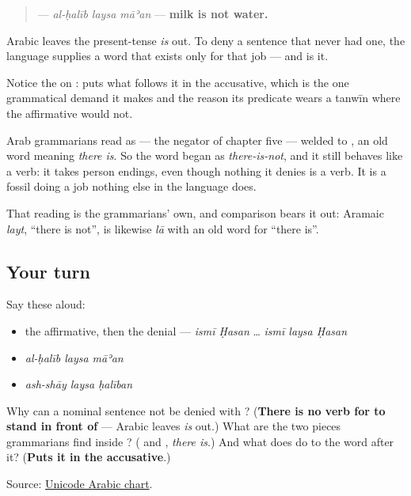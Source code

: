 \begin{quote}
\textbf{  } — \emph{al-ḥalīb laysa māʾan} — \textbf{milk is not water.}
\end{quote}

Arabic leaves the present-tense \emph{is} out. To deny a sentence that never had one, the language supplies a word that exists only for that job — and \textbf{} is it.

Notice the \textbf{} on \textbf{}: \textbf{} puts what follows it in the accusative, which is the one grammatical demand it makes and the reason its predicate wears a tanwīn where the affirmative would not.

\begin{cousinweb}
Arab grammarians read \textbf{} as \textbf{} — the negator of chapter five — welded to \textbf{}, an old word meaning \emph{there is}. So the word began as \emph{there-is-not}, and it still behaves like a verb: it takes person endings, even though nothing it denies is a verb. It is a fossil doing a job nothing else in the language does.

That reading is the grammarians' own, and comparison bears it out: Aramaic \emph{layt}, \textquotedblleft{}there is not\textquotedblright{}, is likewise \emph{lā} with an old word for \textquotedblleft{}there is\textquotedblright{}.
\end{cousinweb}

\subsection*{Your turn}
Say these aloud:

\begin{itemize}
\raggedright
  \item the affirmative, then the denial — \emph{ismī Ḥasan} … \emph{ismī laysa Ḥasan}
  \item \emph{al-ḥalīb laysa māʾan}
  \item \emph{ash-shāy laysa ḥalīban}
\end{itemize}

\begin{tcolorbox}[breakable,colback=teal!4,colframe=teal!35!black,title={Before you move on}]
Why can a nominal sentence not be denied with \textbf{}? (\textbf{There is no verb for  to stand in front of} — Arabic leaves \emph{is} out.) What are the two pieces grammarians find inside \textbf{}? (\textbf{} and \textbf{}, \emph{there is}.) And what does \textbf{} do to the word after it? (\textbf{Puts it in the accusative}.)

Source: \href{https://www.unicode.org/charts/PDF/U0600.pdf}{Unicode Arabic chart}.
\end{tcolorbox}
